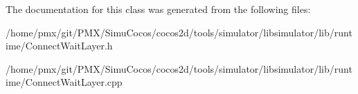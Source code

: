 The documentation for this class was generated from the following files\+:\begin{DoxyCompactItemize}
\item 
/home/pmx/git/\+P\+M\+X/\+Simu\+Cocos/cocos2d/tools/simulator/libsimulator/lib/runtime/Connect\+Wait\+Layer.\+h\item 
/home/pmx/git/\+P\+M\+X/\+Simu\+Cocos/cocos2d/tools/simulator/libsimulator/lib/runtime/Connect\+Wait\+Layer.\+cpp\end{DoxyCompactItemize}
